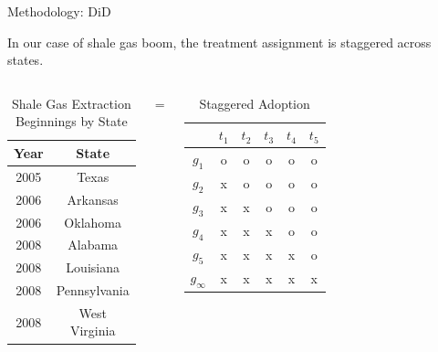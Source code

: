 \documentclass[aspectratio=169,xcolor=dvipsnames]{beamer}
\begin{document}
\begin{frame}{Methodology: \textcite{sun_estimating_2021} DiD}

In our case of shale gas boom, the treatment assignment is staggered across states.
    \begin{columns}
\begin{table}[htbp]
    \centering
    \begin{tabular}{c| c}
        
        Year & State \\
        \hline \hline
        2005 & Texas \\
        2006 & Arkansas \\
        2006 & Oklahoma \\
        2008 & Alabama \\
        2008 & Louisiana \\
        2008 & Pennsylvania \\
        2008 & West Virginia \\
    \end{tabular}
    \caption{Shale Gas Extraction Beginnings by State}
    \label{tab:shale-gas-extraction}
\end{table}
    \centering
    \Huge
    =
    \begin{table}[h]
        \centering
        \begin{tabular}{|c|c|c|c|c|c|}
        \hline
             &$t_1$&$t_2$&$t_3$&$t_4$&$t_5$  \\ \hline
             $g_1$&\textcolor{red!60}{o}&\textcolor{red!60}{o}&\textcolor{red!60}{o}&\textcolor{red!60}{o}&\textcolor{red!60}{o}  \\ \hline
             $g_2$&x&\textcolor{red!60}{o}&\textcolor{red!60}{o}&\textcolor{red!60}{o}&\textcolor{red!60}{o}  \\ \hline
             $g_3$&x&x&\textcolor{red!60}{o}&\textcolor{red!60}{o}&\textcolor{red!60}{o} \\ \hline
             $g_4$&x&x&x&\textcolor{red!60}{o}&\textcolor{red!60}{o}  \\ \hline
             $g_5$&x&x&x&x&\textcolor{red!60}{o}  \\ \hline
             $g_\infty$&x&x&x&x&x  \\ \hline
        \end{tabular}
        \caption{Staggered Adoption}
    \end{table}
\end{columns}

\end{frame}
\end{document}

